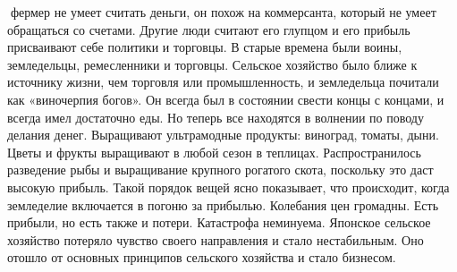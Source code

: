 \documentclass[a4paper]{book}
\begin{document}
фермер не умеет считать деньги, он похож на коммерсанта, который не умеет обращаться со
счетами. Другие люди считают его глупцом и его прибыль присваивают себе политики и
торговцы.
В старые времена были воины, земледельцы, ремесленники и торговцы. Сельское
хозяйство было ближе к источнику жизни, чем торговля или промышленность, и
земледельца почитали как «виночерпия богов». Он всегда был в состоянии свести концы с
концами, и всегда имел достаточно еды.
Но теперь все находятся в волнении по поводу делания денег. Выращивают ультрамодные продукты: виноград, томаты, дыни. Цветы и фрукты выращивают в любой сезон в
теплицах. Распространилось разведение рыбы и выращивание крупного рогатого скота,
поскольку это даст высокую прибыль.
Такой порядок вещей ясно показывает, что происходит, когда земледелие включается в
погоню за прибылью. Колебания цен громадны. Есть прибыли, но есть также и потери.
Катастрофа неминуема. Японское сельское хозяйство потеряло чувство своего
направления и стало нестабильным. Оно отошло от основных принципов сельского
хозяйства и стало бизнесом.
\end{document}
